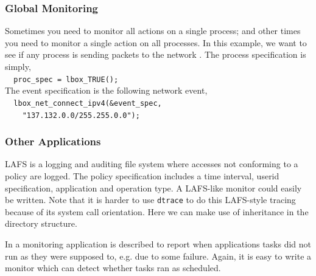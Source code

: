 \subsubsection{Global Monitoring}

Sometimes you need to monitor all actions on a single process;
and other times you need to monitor a single action on all processes.
In this example, we want to see if any process is sending packets
to the network .
The process specification is simply, \\
{\small\verb|  proc_spec = lbox_TRUE();|} \\
The event specification is the following network event, \\
{\small\verb|  lbox_net_connect_ipv4(&event_spec,|} \\
{\small\verb|    "137.132.0.0/255.255.0.0");|}

\subsubsection{Other Applications}

LAFS \cite{wee1995lafs}
is a logging and auditing file system where accesses not conforming
to a policy are logged.
The policy specification
includes a time interval, userid specification, application
and operation type. A LAFS-like monitor could easily be written.
Note that it is harder to use {\tt dtrace} to do this LAFS-style tracing 
because of its system call orientation. Here we can make use of 
inheritance in the directory structure. 

In \cite{finke2002process} a monitoring application is described to report when 
applications tasks did not run as they were supposed to, e.g. due to some
failure. Again, it is easy to write a monitor which can detect whether
tasks ran as scheduled.

